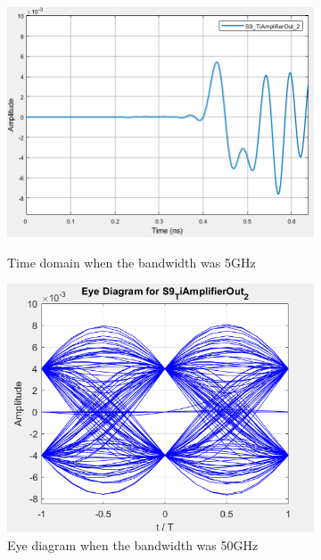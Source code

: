 \begin{figure}[H]
	\centering
        \begin{subfigure}{.55\textwidth}
        \centering
        	\includegraphics[scale=0.45]{./lib/m_qam_receiver/figure_PLoureiro/4QAM_ElectricalNoise_50e9_time.png}
        \label{Example_Time_50GHz}\caption{Time domain when the bandwidth was 5GHz}
        \end{subfigure}%
        \begin{subfigure}{.55\textwidth}
        \centering
        	\includegraphics[scale=0.45]{./lib/m_qam_receiver/figure_PLoureiro/4QAM_ElectricalNoise_50e9_Eye.png}
        	\caption{Eye diagram when the bandwidth was 50GHz}\label{Example_Eye_50GHz}
        \end{subfigure}
        \caption{}\label{50GHz}
\end{figure}

